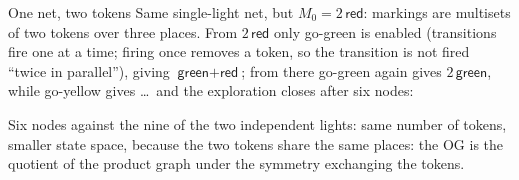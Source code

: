 \begin{examplebox}{One net, two tokens}
Same single-light net, but $M_0 = 2\,\textsf{red}$: markings are multisets of two tokens over three places. From $2\,\textsf{red}$ only \textsf{go-green} is enabled (transitions fire one at a time; firing once removes a token, so the transition is not fired ``twice in parallel''), giving $\textsf{green} + \textsf{red}$; from there \textsf{go-green} again gives $2\,\textsf{green}$, while \textsf{go-yellow} gives \dots\ and the exploration closes after six nodes:
\begin{center}
\end{center}
Six nodes against the nine of the two independent lights: same number of tokens, smaller state space, because the two tokens share the same places: the OG is the quotient of the product graph under the symmetry exchanging the tokens.
\end{examplebox}

